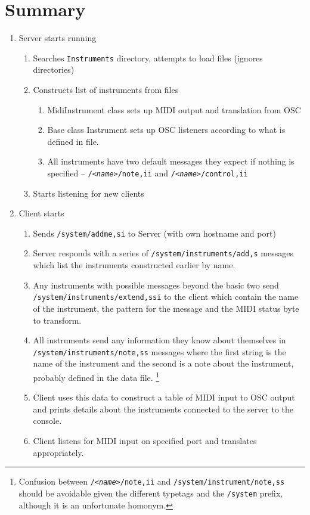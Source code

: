 \documentclass[11pt]{article}
\begin{document}
\raggedright
\section*{Summary}
\begin{enumerate}[\bf1.]
	\item Server starts running
	\begin{enumerate} [\bf a.]                          
		\item Searches \texttt{Instruments} directory, attempts to load files (ignores directories)
		\item Constructs list of instruments from files
		\begin{enumerate}
			\item MidiInstrument class sets up MIDI output and translation from OSC
			\item Base class Instrument sets up OSC listeners according to what is defined in file.
			\item All instruments have two default messages they expect if nothing is specified -- \texttt{/\textit{<name>}/note,ii} and 
				 \texttt{/\textit{<name>}/control,ii} 
		\end{enumerate}
		\item Starts listening for new clients
	 \end{enumerate}
	 \item Client starts 
	 \begin{enumerate} [\bf a.]
	 	\item Sends \texttt{/system/addme,si} to Server (with own hostname and port)
		\item Server responds with a series of \texttt{/system/instruments/add,s} messages which list the instruments constructed earlier by name.
		\item Any instruments with possible messages beyond the basic two send
			 \texttt{/system/instruments/extend,ssi} to the client
			which contain the name of the instrument, the pattern for the message and the MIDI status byte to transform.
		\item All instruments send any information they know about themselves in \texttt{/system/instruments/note,ss} messages where the first 
			string is the name of the instrument and the second is a note about the instrument, probably defined in the data file. \footnote{Confusion
			between \texttt{/\textit{<name>}/note,ii} and \texttt{/system/instrument/note,ss} should be avoidable given the different typetags and the 
			\texttt{/system} prefix, although it is an unfortunate homonym.}
		\item Client uses this data to construct a table of MIDI input to OSC output and prints details about the instruments connected to the server
			to the console.
		\item Client listens for MIDI input on specified port and translates appropriately.
	 \end{enumerate}
\end{enumerate}
\end{document}
